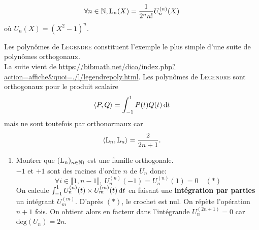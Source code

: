 
$$\forall n \in \mathbb{N}, \mathrm{L}_n(X) = \frac{1}{2^n n!} U_n^{(n)}(X)$$
où $U_n(X) = (X^2-1)^n$.

Les polynômes de \textsc{Legendre} constituent l'exemple le plus simple d'une suite de polynômes orthogonaux. \\
La suite vient de \url{https://bibmath.net/dico/index.php?action=affiche&quoi=./l/legendrepoly.html}.
Les polynômes de \textsc{Legendre} sont orthogonaux pour le produit scalaire
$$\langle P, Q \rangle = \int_{-1}^1 P(t) Q(t) \, \mathrm{d} t$$
mais ne sont toutefois par orthonormaux car
$$\langle \mathrm{L}_n, \mathrm{L}_n \rangle = \frac{2}{2n+1}.$$

\begin{enumerate}
    \item Montrer que $(\mathrm{L}_n)_{n \in \mathbb{N})}$ est une famille orthogonale. \\
    $-1$ et $+1$ sont des racines d'ordre $n$ de $U_n$ donc:
    $$\forall i \in \llbracket 1, n-1 \rrbracket,\ U_n^{(n)}(-1) = U_n^{(n)}(1) = 0 \quad (*)$$
    On calcule $\int_{-1}^{1} U_n^{(n)}(t) \times U_m^{(m)}(t)\, \mathrm{d} t$ en faisant une \textbf{intégration par parties} un intégrant $U_m^{(m)}$. D'après $(*)$, le crochet est nul. On répète l'opération $n+1$ fois. On obtient alors en facteur dans l'intégrande $U_n^{(2n+1)} = 0$ car $\mathrm{deg}(U_n) = 2n$.
\end{enumerate}